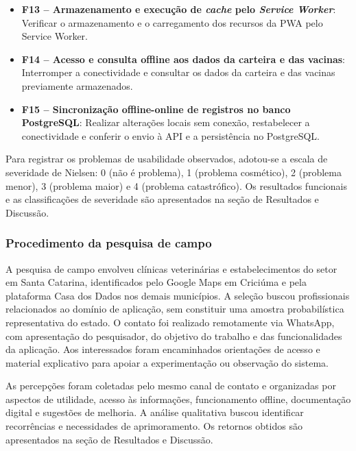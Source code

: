 \documentclass{UNESC}
\begin{document}
\begin{itemize}
    \item \textbf{F13 -- Armazenamento e execução de \textit{cache} pelo \textit{Service Worker}}: Verificar o armazenamento e o carregamento dos recursos da PWA pelo Service Worker.
    \item \textbf{F14 -- Acesso e consulta offline aos dados da carteira e das vacinas}: Interromper a conectividade e consultar os dados da carteira e das vacinas previamente armazenados.
    \item \textbf{F15 -- Sincronização offline-online de registros no banco PostgreSQL}: Realizar alterações locais sem conexão, restabelecer a conectividade e conferir o envio à API e a persistência no PostgreSQL.
\end{itemize}

Para registrar os problemas de usabilidade observados, adotou-se a escala de severidade de Nielsen: 0 (não é problema), 1 (problema cosmético), 2 (problema menor), 3 (problema maior) e 4 (problema catastrófico). Os resultados funcionais e as classificações de severidade são apresentados na seção de Resultados e Discussão.

\subsubsection{Procedimento da pesquisa de campo}

A pesquisa de campo envolveu clínicas veterinárias e estabelecimentos do setor em Santa Catarina, identificados pelo Google Maps em Criciúma e pela plataforma Casa dos Dados nos demais municípios. A seleção buscou profissionais relacionados ao domínio de aplicação, sem constituir uma amostra probabilística representativa do estado. O contato foi realizado remotamente via WhatsApp, com apresentação do pesquisador, do objetivo do trabalho e das funcionalidades da aplicação. Aos interessados foram encaminhados orientações de acesso e material explicativo para apoiar a experimentação ou observação do sistema.

As percepções foram coletadas pelo mesmo canal de contato e organizadas por aspectos de utilidade, acesso às informações, funcionamento offline, documentação digital e sugestões de melhoria. A análise qualitativa buscou identificar recorrências e necessidades de aprimoramento. Os retornos obtidos são apresentados na seção de Resultados e Discussão.

\begingroup
\makeatletter
\makeatother
\end{document}
